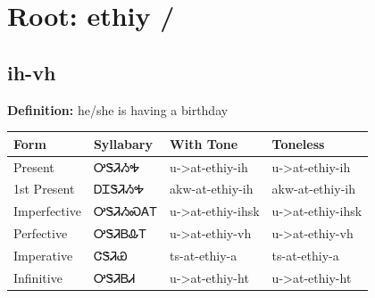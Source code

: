 \documentclass{article}%
\begin{document}
%
\normalsize%
\section*{Root: ethiy / }%
\subsection*{ih-vh}%
\textbf{Definition: }%
he/she is having a birthday%
\\[0.5em]%
\begin{tabular}{|l|l|l|l|}%
\hline%
\textbf{Form}&\textbf{Syllabary}&\textbf{With Tone}&\textbf{Toneless}\\%
\hline%
Present&ᎤᏕᏘᏱᎭ&u{-}>at{-}ethiy{-}ih&u{-}>at{-}ethiy{-}ih\\%
1st Present&ᎠᏆᏕᏘᏱᎭ&akw{-}at{-}ethiy{-}ih&akw{-}at{-}ethiy{-}ih\\%
Imperfective&ᎤᏕᏘᏱᏍᎪᎢ&u{-}>at{-}ethiy{-}ihsk&u{-}>at{-}ethiy{-}ihsk\\%
Perfective&ᎤᏕᏘᏴᎲᎢ&u{-}>at{-}ethiy{-}vh&u{-}>at{-}ethiy{-}vh\\%
Imperative&ᏣᏕᏘᏯ&ts{-}at{-}ethiy{-}a&ts{-}at{-}ethiy{-}a\\%
Infinitive&ᎤᏕᏘᏴᏗ&u{-}>at{-}ethiy{-}ht&u{-}>at{-}ethiy{-}ht\\%
\hline%
\end{tabular}%
\\[1em]%
\end{document}
